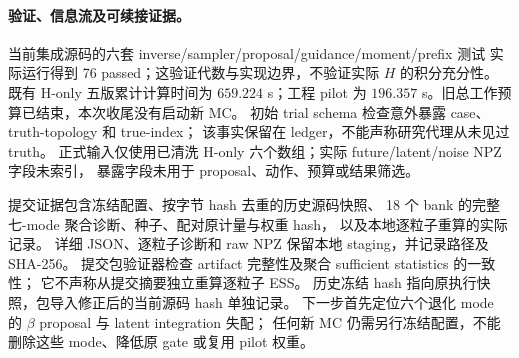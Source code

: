 \paragraph{验证、信息流及可续接证据。}
当前集成源码的六套 inverse/sampler/proposal/guidance/moment/prefix 测试
实际运行得到 76 passed；这验证代数与实现边界，不验证实际 $H$ 的积分充分性。
既有 H-only 五版累计计算时间为 $659.224$ s；工程 pilot 为
$196.357$ s。旧总工作预算已结束，本次收尾没有启动新 MC。
初始 trial schema 检查意外暴露 case、truth-topology 和 true-index；
该事实保留在 ledger，不能声称研究代理从未见过 truth。
正式输入仅使用已清洗 H-only 六个数组；实际 future/latent/noise NPZ 字段未索引，
暴露字段未用于 proposal、动作、预算或结果筛选。

提交证据包含冻结配置、按字节 hash 去重的历史源码快照、
18 个 bank 的完整七-mode 聚合诊断、种子、配对原计量与权重 hash，
以及本地逐粒子重算的实际记录。
详细 JSON、逐粒子诊断和 raw NPZ 保留本地 staging，并记录路径及 SHA-256。
提交包验证器检查 artifact 完整性及聚合 sufficient statistics 的一致性；
它不声称从提交摘要独立重算逐粒子 ESS。
历史冻结 hash 指向原执行快照，包导入修正后的当前源码 hash 单独记录。
下一步首先定位六个退化 mode 的 $\beta$ proposal 与 latent integration 失配；
任何新 MC 仍需另行冻结配置，不能删除这些 mode、降低原 gate 或复用 pilot 权重。
